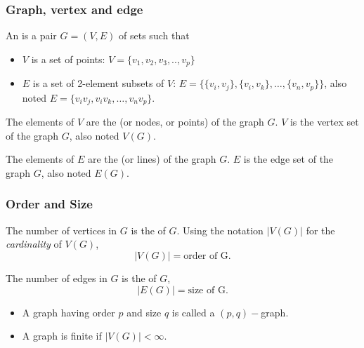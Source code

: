 \documentclass[aspectratio=169]{beamer}
\begin{document}
\begin{frame}\frametitle{Graph, vertex and edge} 
	\begin{definition}[Graph]
	An  is a pair $G=(V,E)$ of sets such that
	\begin{itemize}
	\item $V$ is a set of points:  $V=\{v_1,v_2,v_3,..,v_p\}$
	\item $E$ is a set of 2-element subsets of $V$: $E=\{\{v_i,v_j\},\{v_i,v_k\},\dots,\{v_n,v_p\}\}$, also noted $E=\{v_iv_j,v_iv_k,\dots,v_nv_p\}$.
	\end{itemize}
	\end{definition}
	\begin{definition}[Vertex]
	The elements of $V$ are the  (or nodes, or points) of the graph $G$.
	$V$ is the vertex set of the graph $G$, also noted $V(G)$.
	\end{definition}
	\begin{definition}[Edge]
	The elements of $E$ are the  (or lines) of the graph $G$.
	$E$ is the edge set of the graph $G$, also noted $E(G)$.
	\end{definition}
\end{frame}

\begin{frame}\frametitle{Order and Size}
	\begin{definition}
	The number of vertices in $G$ is the  of $G$. Using the notation $|V(G)|$ for the \emph{cardinality} of $V(G)$,
	$$|V(G)|=\textrm{order of G}.$$
	\end{definition}
	\begin{definition}
	The number of edges in $G$ is the  of $G$,
	$$|E(G)|=\textrm{size of G}.$$
	\end{definition}
	\begin{itemize}
	\item A graph having order $p$ and size $q$ is called a $(p,q)-$graph.
	\item A graph is finite if $|V(G)|<\infty$.
	\end{itemize}
\end{frame}
\end{document}
